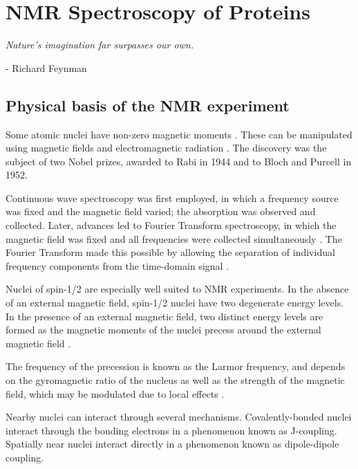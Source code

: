 \chapter{NMR Spectroscopy of Proteins}
\begin{center}
  \textit{Nature's imagination far surpasses our own.}

 - Richard Feynman
\end{center}


\section{Physical basis of the NMR experiment}

Some atomic nuclei have non-zero magnetic moments \cite{zeeman1897effect}. 
These can be manipulated using magnetic fields and electromagnetic radiation 
\cite{bloch1946nuclear, rabi1938}.  The discovery was the subject of two 
Nobel prizes, awarded to Rabi in 1944 and to Bloch and Purcell in 1952.

Continuous wave spectroscopy was first employed, in which a frequency source 
was fixed and the magnetic field varied; the absorption was observed and 
collected.  Later, advances led to Fourier Transform spectroscopy, in which
the magnetic field was fixed and all frequencies were collected simultaneously
\cite{aue1976two}.  The Fourier Transform made this possible by allowing the
separation of individual frequency components from the time-domain signal
\cite{ernst2004}.

Nuclei of spin-1/2 are especially well suited to NMR experiments.  In the 
absence of an external magnetic field, spin-1/2 nuclei have two degenerate 
energy levels.  In the presence of an external magnetic field, two distinct 
energy levels are formed as the magnetic moments of the nuclei precess 
around the external magnetic field \cite{hahn1950spin, bloembergen1948relaxation}.

The frequency of the precession is known as the Larmor frequency, and depends 
on the gyromagnetic ratio of the nucleus as well as the strength of the 
magnetic field, which may be modulated due to local effects
\cite{carr1954effects, meiboom1958modified}.

Nearby nuclei can interact through several mechanisms.  Covalently-bonded nuclei
interact through the bonding electrons in a phenomenon known as J-coupling.
Spatially near nuclei interact directly in a phenomenon known as dipole-dipole
coupling.

